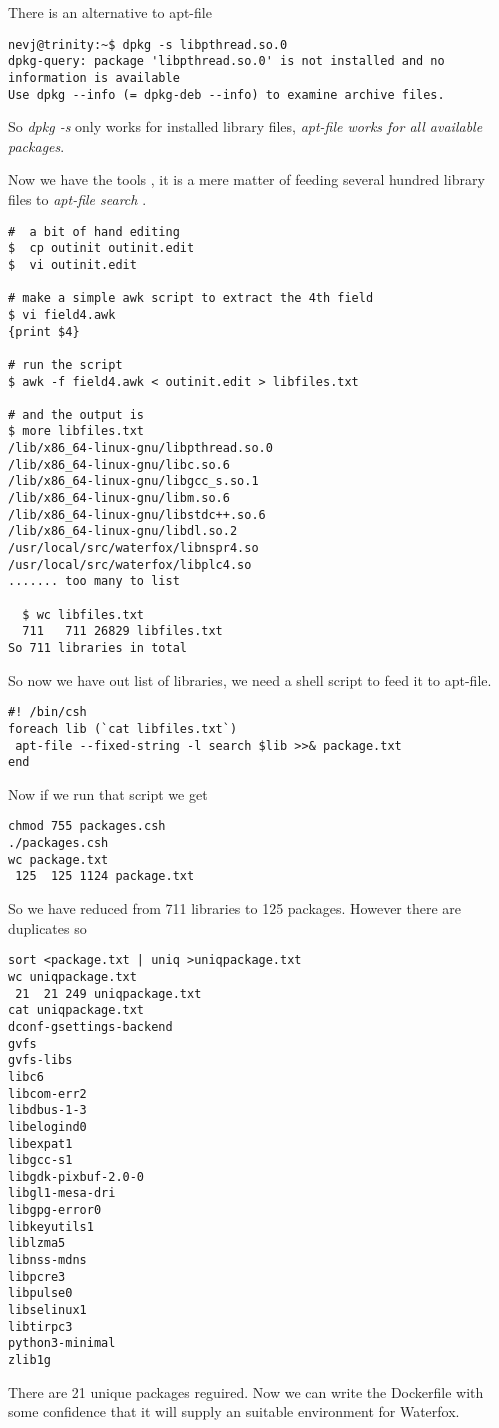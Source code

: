 \documentclass{article}  %
\begin{document}
There is an alternative to apt-file
\begin{verbatim}
nevj@trinity:~$ dpkg -s libpthread.so.0
dpkg-query: package 'libpthread.so.0' is not installed and no information is available
Use dpkg --info (= dpkg-deb --info) to examine archive files.
\end{verbatim}
 So {\em dpkg -s} only works for installed library files, {\em apt-file works for all available packages}.

Now we have the tools , it is a mere matter of feeding several hundred library files to {\em apt-file search} . 
\begin{verbatim}
#  a bit of hand editing
$  cp outinit outinit.edit
$  vi outinit.edit

# make a simple awk script to extract the 4th field
$ vi field4.awk
{print $4}

# run the script
$ awk -f field4.awk < outinit.edit > libfiles.txt

# and the output is
$ more libfiles.txt
/lib/x86_64-linux-gnu/libpthread.so.0
/lib/x86_64-linux-gnu/libc.so.6
/lib/x86_64-linux-gnu/libgcc_s.so.1
/lib/x86_64-linux-gnu/libm.so.6
/lib/x86_64-linux-gnu/libstdc++.so.6
/lib/x86_64-linux-gnu/libdl.so.2
/usr/local/src/waterfox/libnspr4.so
/usr/local/src/waterfox/libplc4.so
....... too many to list

  $ wc libfiles.txt
  711   711 26829 libfiles.txt
So 711 libraries in total
\end{verbatim}
  So now we have out list of libraries,  we need a shell script to feed it to apt-file.
\begin{lstlisting}
#! /bin/csh
foreach lib (`cat libfiles.txt`)
 apt-file --fixed-string -l search $lib >>& package.txt
end
\end{lstlisting}
Now if we run that script we get
\begin{verbatim}
chmod 755 packages.csh
./packages.csh
wc package.txt
 125  125 1124 package.txt
\end{verbatim}
So we have reduced from 711 libraries  to 125 packages. However there are duplicates so
\begin{verbatim}
sort <package.txt | uniq >uniqpackage.txt
wc uniqpackage.txt
 21  21 249 uniqpackage.txt
cat uniqpackage.txt
dconf-gsettings-backend
gvfs
gvfs-libs
libc6
libcom-err2
libdbus-1-3
libelogind0
libexpat1
libgcc-s1
libgdk-pixbuf-2.0-0
libgl1-mesa-dri
libgpg-error0
libkeyutils1
liblzma5
libnss-mdns
libpcre3
libpulse0
libselinux1
libtirpc3
python3-minimal
zlib1g
\end{verbatim}
 There are 21 unique packages reguired.
Now we can write the Dockerfile with some confidence that it will supply an suitable environment for Waterfox.
\end{document}
